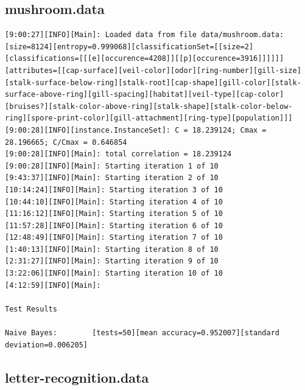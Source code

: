 \documentclass[10pt]{report}
\begin{document}
\subsection*{mushroom.data}
{\small
\begin{verbatim}
[9:00:27][INFO][Main]: Loaded data from file data/mushroom.data: [size=8124][entropy=0.999068][classificationSet=[[size=2][classifications=[[[e][occurence=4208]][[p][occurence=3916]]]]]][attributes=[[cap-surface][veil-color][odor][ring-number][gill-size][stalk-surface-below-ring][stalk-root][cap-shape][gill-color][stalk-surface-above-ring][gill-spacing][habitat][veil-type][cap-color][bruises?][stalk-color-above-ring][stalk-shape][stalk-color-below-ring][spore-print-color][gill-attachment][ring-type][population]]] 
[9:00:28][INFO][instance.InstanceSet]: C = 18.239124; Cmax = 28.196665; C/Cmax = 0.646854 
[9:00:28][INFO][Main]: total correlation = 18.239124 
[9:00:28][INFO][Main]: Starting iteration 1 of 10 
[9:43:37][INFO][Main]: Starting iteration 2 of 10 
[10:14:24][INFO][Main]: Starting iteration 3 of 10 
[10:44:10][INFO][Main]: Starting iteration 4 of 10 
[11:16:12][INFO][Main]: Starting iteration 5 of 10 
[11:57:28][INFO][Main]: Starting iteration 6 of 10 
[12:48:49][INFO][Main]: Starting iteration 7 of 10 
[1:40:13][INFO][Main]: Starting iteration 8 of 10 
[2:31:27][INFO][Main]: Starting iteration 9 of 10 
[3:22:06][INFO][Main]: Starting iteration 10 of 10 
[4:12:59][INFO][Main]:

Test Results

Naive Bayes:		[tests=50][mean accuracy=0.952007][standard deviation=0.006205] 
\end{verbatim}
}


\subsection*{letter-recognition.data}
{\small
\begin{verbatim}

\end{verbatim}
}
\end{document}
